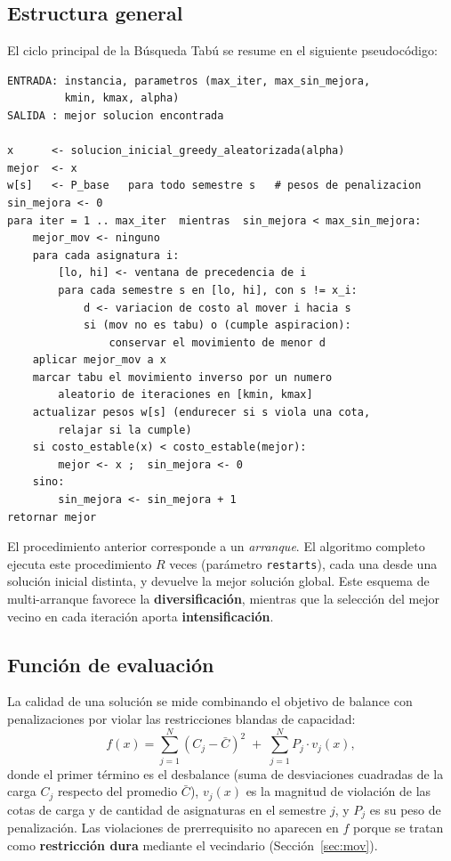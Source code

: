 \documentclass[letter, 10pt]{article}
\begin{document}
\subsection{Estructura general}
El ciclo principal de la B\'usqueda Tab\'u se resume en el siguiente pseudoc\'odigo:

\begin{verbatim}
ENTRADA: instancia, parametros (max_iter, max_sin_mejora,
         kmin, kmax, alpha)
SALIDA : mejor solucion encontrada

x      <- solucion_inicial_greedy_aleatorizada(alpha)
mejor  <- x
w[s]   <- P_base   para todo semestre s   # pesos de penalizacion
sin_mejora <- 0
para iter = 1 .. max_iter  mientras  sin_mejora < max_sin_mejora:
    mejor_mov <- ninguno
    para cada asignatura i:
        [lo, hi] <- ventana de precedencia de i
        para cada semestre s en [lo, hi], con s != x_i:
            d <- variacion de costo al mover i hacia s
            si (mov no es tabu) o (cumple aspiracion):
                conservar el movimiento de menor d
    aplicar mejor_mov a x
    marcar tabu el movimiento inverso por un numero
        aleatorio de iteraciones en [kmin, kmax]
    actualizar pesos w[s] (endurecer si s viola una cota,
        relajar si la cumple)
    si costo_estable(x) < costo_estable(mejor):
        mejor <- x ;  sin_mejora <- 0
    sino:
        sin_mejora <- sin_mejora + 1
retornar mejor
\end{verbatim}

\noindent El procedimiento anterior corresponde a un \emph{arranque}. El algoritmo completo ejecuta este procedimiento $R$ veces (par\'ametro \texttt{restarts}), cada una desde una soluci\'on inicial distinta, y devuelve la mejor soluci\'on global. Este esquema de multi-arranque favorece la \textbf{diversificaci\'on}, mientras que la selecci\'on del mejor vecino en cada iteraci\'on aporta \textbf{intensificaci\'on}.

\subsection{Funci\'on de evaluaci\'on}
La calidad de una soluci\'on se mide combinando el objetivo de balance con penalizaciones por violar las restricciones blandas de capacidad:
$$f(x) = \sum_{j=1}^{N} (C_j - \bar{C})^2 \;+\; \sum_{j=1}^{N} P_j \cdot v_j(x),$$
donde el primer t\'ermino es el desbalance (suma de desviaciones cuadradas de la carga $C_j$ respecto del promedio $\bar{C}$), $v_j(x)$ es la magnitud de violaci\'on de las cotas de carga y de cantidad de asignaturas en el semestre $j$, y $P_j$ es su peso de penalizaci\'on. Las violaciones de prerrequisito no aparecen en $f$ porque se tratan como \textbf{restricci\'on dura} mediante el vecindario (Secci\'on~\ref{sec:mov}).
\end{document}
